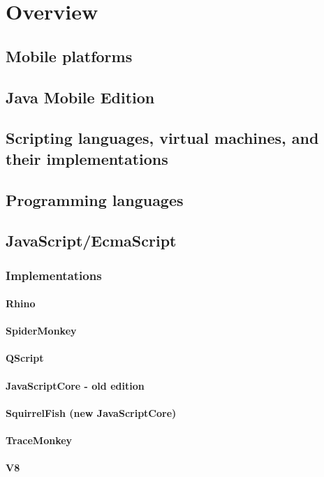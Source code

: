 \chapter{Overview}
\section{Mobile platforms}

\section{Java Mobile Edition}
\section{Scripting languages, virtual machines, and their implementations}
\section{Programming languages}
\section{JavaScript/EcmaScript}
\subsection{Implementations}
\subsubsection{Rhino}
\subsubsection{SpiderMonkey}
\label{spidermonkey}
\subsubsection{QScript}
\subsubsection{JavaScriptCore - old edition}
\subsubsection{SquirrelFish (new JavaScriptCore)}
\subsubsection{TraceMonkey}
\subsubsection{V8}
